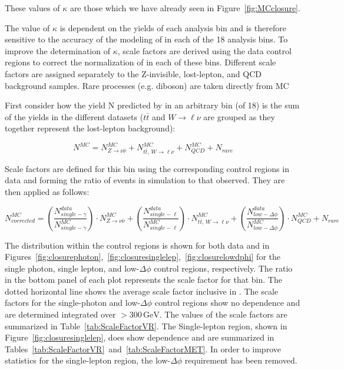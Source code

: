 These values of $\kappa$ are those which we have already seen in Figure~\ref{fig:MCclosure}.

The value of $\kappa$ is dependent on the yields of each analysis bin and is therefore sensitive to the accuracy of the modeling of  in each of the 18 analysis bins. To improve the determination of $\kappa$, scale factors are derived using the data control regions to correct the normalization of  in each of these bins. Different scale factors are assigned separately to the Z-invisible, lost-lepton, and QCD background  samples. Rare processes (e.g. diboson) are taken directly from MC

First consider how the yield N predicted by  in an arbitrary bin (of 18) is the sum of the yields in the different  datasets ($t\bar{t}$ and $W\rightarrow\ell\nu$ are grouped as they together represent the lost-lepton background):

\begin{equation}
N^{MC} = N_{Z\rightarrow\nu\bar{\nu}}^{MC} + N_{t\bar{t},\,W\rightarrow\ell\nu}^{MC} + N_{QCD}^{MC} + N_{rare}
\end{equation}

Scale factors are defined for this bin using the corresponding control regions in data and forming the ratio of events in simulation to that observed. They are then applied as follows:

\begin{equation}
N_{corrected}^{MC} = \left(\frac{N_{single-\gamma}^{data}}{N_{single-\gamma}^{MC}}\right) \cdot N_{Z\rightarrow\nu\bar{\nu}}^{MC} + \left(\frac{N^{data}_{single-\ell}}{N^{MC}_{single-\ell}}\right) \cdot N^{MC}_{t\bar{t},\,W\rightarrow\ell\nu} + \left(\frac{N^{data}_{low-\Delta\phi}}{N^{MC}_{low-\Delta\phi}}\right) \cdot N_{QCD}^{MC} + N_{rare}
\end{equation}

The \ptmiss distribution within the control regions is shown for both data and  in Figures~\ref{fig:closurephoton},~\ref{fig:closuresinglelep},~\ref{fig:closurelowdphi} for the single photon, single lepton, and low-$\Delta\phi$ control regions, respectively. The ratio in the bottom panel of each plot represents the scale factor for that \ptmiss bin. The dotted horizontal line shows the average scale factor inclusive in \ptmiss. The scale factors for the single-photon and low-$\Delta\phi$ control regions show no \ptmiss dependence and are determined integrated over \ptmiss$>300\,\textrm{GeV}$. The values of the scale factors are summarized in Table~\ref{tab:ScaleFactorVR}. The Single-lepton region, shown in Figure~\ref{fig:closuresinglelep}, does show \ptmiss dependence and are summarized in Tables~\ref{tab:ScaleFactorVR}~and~\ref{tab:ScaleFactorMET}.  In order to improve statistics for the single-lepton region, the low-$\Delta\phi$ requirement has been removed.

